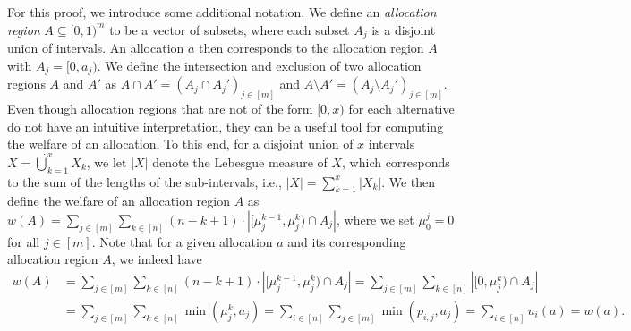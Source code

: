 \documentclass[11pt]{article}
\begin{document}
For this proof, we introduce some additional notation. We define an \textit{allocation region}
$A\subseteq [0,1)^m$ to be a vector of subsets, where each subset $A_j$ is a disjoint union of intervals. An allocation $a$ then corresponds to the allocation region $A$ with $A_j = [0, a_j)$. We define the intersection and exclusion of two allocation regions $A$ and $A'$ as $A \cap A' = (A_j \cap A_j')_{j\in [m]}$ and $A \setminus A' = (A_j \setminus A_j')_{j\in [m]}$. Even though allocation regions that are not of the form $[0, x)$ for each alternative do not have an intuitive interpretation, they can be a useful tool for computing the welfare of an allocation. To this end, for a disjoint union of $x$ intervals $X = \dot{\bigcup}_{k = 1}^x X_k$, we let $|X|$ denote the Lebesgue measure of $X$, which corresponds to the sum of the lengths of the sub-intervals, i.e., $|X| = \sum_{k = 1}^x |X_k|$. We then define the welfare of an allocation region $A$ as $w(A) = \sum_{j \in [m]} \sum_{k \in [n]} (n-k+1) \cdot |[\mu^{k-1}_j, \mu^k_j) \cap A_j|$, where we set $\mu^j_0 = 0$ for all $j \in [m]$. Note that for a given allocation $a$ and its corresponding allocation region $A$, we indeed have
\begin{align*}
    w(A) &= \sum_{j \in [m]} \sum_{k \in [n]} (n-k+1) \cdot |[\mu^{k-1}_j, \mu^k_j) \cap A_j|
    = \sum_{j \in [m]} \sum_{k \in [n]} |[0, \mu^k_j) \cap A_j| \\
    & = \sum_{j \in [m]} \sum_{k \in [n]} \min(\mu^k_j, a_j) 
    = \sum_{i \in [n]} \sum_{j \in [m]} \min(p_{i,j}, a_j)
    = \sum_{i \in [n]} u_i(a) = w(a).
\end{align*} 
\end{document}
